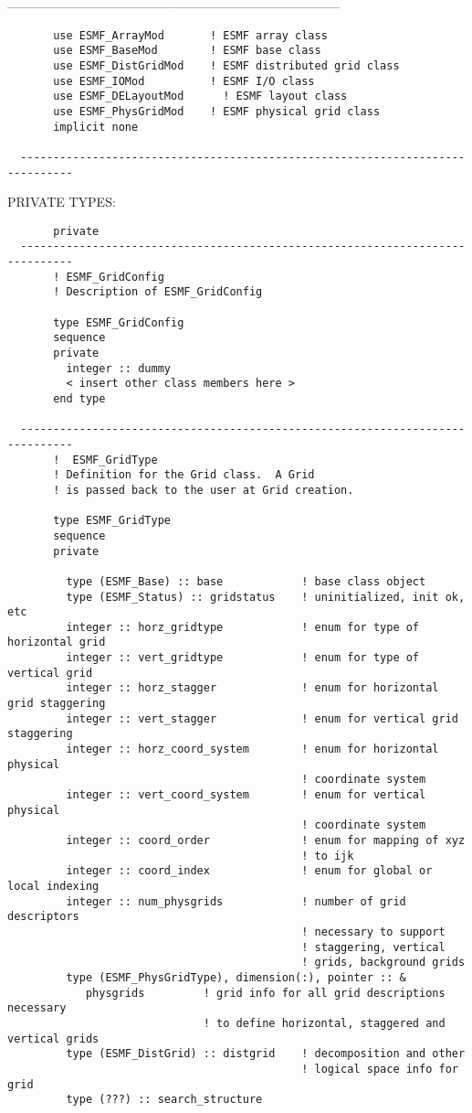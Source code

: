   ------------------------------------------------------------------------------
\begin{verbatim}       use ESMF_ArrayMod       ! ESMF array class
       use ESMF_BaseMod        ! ESMF base class
       use ESMF_DistGridMod    ! ESMF distributed grid class
       use ESMF_IOMod          ! ESMF I/O class
       use ESMF_DELayoutMod      ! ESMF layout class
       use ESMF_PhysGridMod    ! ESMF physical grid class
       implicit none
 
  ------------------------------------------------------------------------------\end{verbatim}{\sf PRIVATE TYPES:}
\begin{verbatim}       private
  ------------------------------------------------------------------------------
       ! ESMF_GridConfig
       ! Description of ESMF_GridConfig
 
       type ESMF_GridConfig
       sequence
       private
         integer :: dummy
         < insert other class members here >
       end type
 
  ------------------------------------------------------------------------------
       !  ESMF_GridType
       ! Definition for the Grid class.  A Grid
       ! is passed back to the user at Grid creation.
 
       type ESMF_GridType
       sequence
       private
 
         type (ESMF_Base) :: base            ! base class object
         type (ESMF_Status) :: gridstatus    ! uninitialized, init ok, etc
         integer :: horz_gridtype            ! enum for type of horizontal grid
         integer :: vert_gridtype            ! enum for type of vertical grid
         integer :: horz_stagger             ! enum for horizontal grid staggering
         integer :: vert_stagger             ! enum for vertical grid staggering
         integer :: horz_coord_system        ! enum for horizontal physical
                                             ! coordinate system
         integer :: vert_coord_system        ! enum for vertical physical
                                             ! coordinate system
         integer :: coord_order              ! enum for mapping of xyz 
                                             ! to ijk
         integer :: coord_index              ! enum for global or local indexing
         integer :: num_physgrids            ! number of grid descriptors
                                             ! necessary to support
                                             ! staggering, vertical
                                             ! grids, background grids
         type (ESMF_PhysGridType), dimension(:), pointer :: &
            physgrids         ! grid info for all grid descriptions necessary
                              ! to define horizontal, staggered and vertical grids
         type (ESMF_DistGrid) :: distgrid    ! decomposition and other
                                             ! logical space info for grid
         type (???) :: search_structure
 

\end{verbatim}
